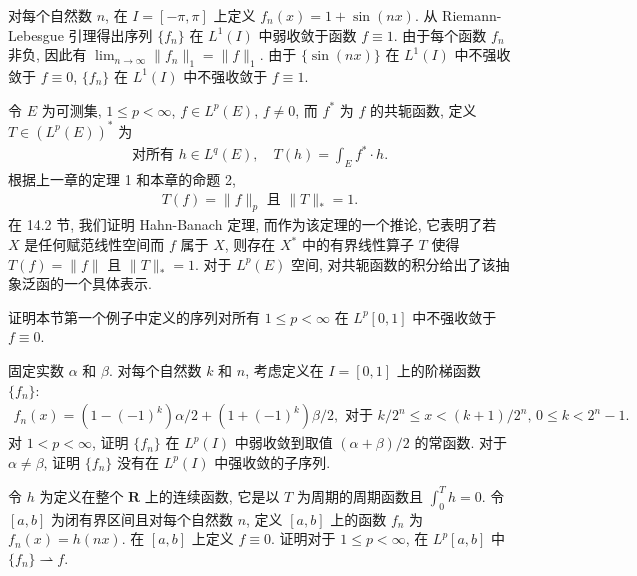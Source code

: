 \documentclass[../../main.tex]{subfiles}
\begin{document}
\begin{example}\label{example:ch08-Radon反例}
对每个自然数 $n$, 在 $I=[-\pi,\pi]$ 上定义 $f_{n}(x)=1+\sin(nx)$. 从 Riemann-Lebesgue 引理得出序列 $\{f_{n}\}$ 在 $L^{1}(I)$ 中弱收敛于函数 $f\equiv 1$. 由于每个函数 $f_{n}$ 非负, 因此有 $\lim_{n\to\infty}\|f_{n}\|_{1}=\|f\|_{1}$. 由于 $\{\sin(nx)\}$ 在 $L^{1}(I)$ 中不强收敛于 $f\equiv 0$, $\{f_{n}\}$ 在 $L^{1}(I)$ 中不强收敛于 $f\equiv 1$.
\end{example}

\begin{remark}\label{remark:ch08-共轭函数泛函}
令 $E$ 为可测集, $1\leqslant p<\infty$, $f\in L^{p}(E)$, $f\neq 0$, 而 $f^{*}$ 为 $f$ 的共轭函数, 定义 $T\in(L^{p}(E))^{*}$ 为
\begin{align}
\text{对所有 }h\in L^{q}(E),\quad T(h)=\int_{E}f^{*}\cdot h.\label{align:ch08-共轭函数泛函}
\end{align}
根据上一章的定理 1 和本章的命题 2,
\begin{align}
T(f)=\|f\|_{p}\text{ 且 }\|T\|_{*}=1.\label{align:ch08-共轭函数泛函范数}
\end{align}
在 14.2 节, 我们证明 Hahn-Banach 定理, 而作为该定理的一个推论, 它表明了若 $X$ 是任何赋范线性空间而 $f$ 属于 $X$, 则存在 $X^{*}$ 中的有界线性算子 $T$ 使得 $T(f)=\|f\|$ 且 $\|T\|_{*}=1$. 对于 $L^{p}(E)$ 空间, 对共轭函数的积分给出了该抽象泛函的一个具体表示.
\end{remark}

\begin{exercise}\label{exercise:ch08-12}
证明本节第一个例子中定义的序列对所有 $1\leqslant p<\infty$ 在 $L^{p}[0,1]$ 中不强收敛于 $f\equiv 0$.
\end{exercise}

\begin{exercise}\label{exercise:ch08-13}
固定实数 $\alpha$ 和 $\beta$. 对每个自然数 $k$ 和 $n$, 考虑定义在 $I=[0,1]$ 上的阶梯函数 $\{f_{n}\}$:
\begin{align*}
f_{n}(x)=(1-(-1)^{k})\alpha/2+(1+(-1)^{k})\beta/2,\text{ 对于 }k/2^{n}\leqslant x<(k+1)/2^{n},\,0\leqslant k<2^{n}-1.
\end{align*}
对 $1<p<\infty$, 证明 $\{f_{n}\}$ 在 $L^{p}(I)$ 中弱收敛到取值 $(\alpha+\beta)/2$ 的常函数. 对于 $\alpha\neq\beta$, 证明 $\{f_{n}\}$ 没有在 $L^{p}(I)$ 中强收敛的子序列.
\end{exercise}

\begin{exercise}\label{exercise:ch08-14}
令 $h$ 为定义在整个 $\mathbf{R}$ 上的连续函数, 它是以 $T$ 为周期的周期函数且 $\int_{0}^{T}h=0$. 令 $[a,b]$ 为闭有界区间且对每个自然数 $n$, 定义 $[a,b]$ 上的函数 $f_{n}$ 为 $f_{n}(x)=h(nx)$. 在 $[a,b]$ 上定义 $f\equiv 0$. 证明对于 $1\leqslant p<\infty$, 在 $L^{p}[a,b]$ 中 $\{f_{n}\}\rightharpoonup f$.
\end{exercise}
\end{document}
